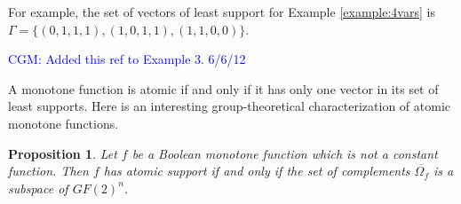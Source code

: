 \documentclass[12pt]{article}
\def\blue#1{\textcolor{blue}{#1}}
\newcommand{\cgm}[1]{\blue{CGM: #1}}
\newtheorem{proposition}[theorem]{Proposition}
\begin{document}
For example, the set of vectors of least support for Example \ref{example:4vars} is 
$\Gamma = \{ (0,1,1,1),(1,0,1,1),(1,1,0,0)\}$.

\cgm{Added this ref to Example 3. 6/6/12}

 A monotone function is atomic if and only if it has only one vector in
its set of least supports.
Here is an interesting group-theoretical characterization of atomic
monotone functions.

\begin{proposition}
\label{prop:atomic-subspace}
Let $f$ be a Boolean monotone function which is not a constant function.
Then $f$ has atomic support if and only if the
set of complements $\overline{\Omega_f}$ is a subspace of $GF(2)^n$.
\end{proposition}
\end{document}
